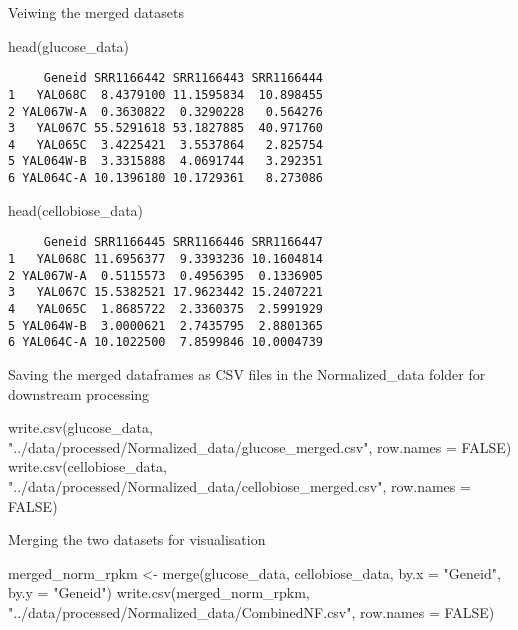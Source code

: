 \documentclass[
  letterpaper,
  DIV=11,
  numbers=noendperiod]{scrartcl}
\newenvironment{Shaded}{\begin{snugshade}}{\end{snugshade}}
\newcommand{\AttributeTok}[1]{\textcolor[rgb]{0.40,0.45,0.13}{#1}}
\newcommand{\ConstantTok}[1]{\textcolor[rgb]{0.56,0.35,0.01}{#1}}
\newcommand{\FunctionTok}[1]{\textcolor[rgb]{0.28,0.35,0.67}{#1}}
\newcommand{\NormalTok}[1]{\textcolor[rgb]{0.00,0.23,0.31}{#1}}
\newcommand{\OtherTok}[1]{\textcolor[rgb]{0.00,0.23,0.31}{#1}}
\newcommand{\StringTok}[1]{\textcolor[rgb]{0.13,0.47,0.30}{#1}}
\begin{document}
Veiwing the merged datasets

\begin{Shaded}
\begin{Highlighting}[]
\FunctionTok{head}\NormalTok{(glucose\_data)}
\end{Highlighting}
\end{Shaded}

\begin{verbatim}
     Geneid SRR1166442 SRR1166443 SRR1166444
1   YAL068C  8.4379100 11.1595834  10.898455
2 YAL067W-A  0.3630822  0.3290228   0.564276
3   YAL067C 55.5291618 53.1827885  40.971760
4   YAL065C  3.4225421  3.5537864   2.825754
5 YAL064W-B  3.3315888  4.0691744   3.292351
6 YAL064C-A 10.1396180 10.1729361   8.273086
\end{verbatim}

\begin{Shaded}
\begin{Highlighting}[]
\FunctionTok{head}\NormalTok{(cellobiose\_data)}
\end{Highlighting}
\end{Shaded}

\begin{verbatim}
     Geneid SRR1166445 SRR1166446 SRR1166447
1   YAL068C 11.6956377  9.3393236 10.1604814
2 YAL067W-A  0.5115573  0.4956395  0.1336905
3   YAL067C 15.5382521 17.9623442 15.2407221
4   YAL065C  1.8685722  2.3360375  2.5991929
5 YAL064W-B  3.0000621  2.7435795  2.8801365
6 YAL064C-A 10.1022500  7.8599846 10.0004739
\end{verbatim}

Saving the merged dataframes as CSV files in the Normalized\_data folder
for downstream processing

\begin{Shaded}
\begin{Highlighting}[]
\FunctionTok{write.csv}\NormalTok{(glucose\_data, }\StringTok{"../data/processed/Normalized\_data/glucose\_merged.csv"}\NormalTok{, }\AttributeTok{row.names =} \ConstantTok{FALSE}\NormalTok{)}
\FunctionTok{write.csv}\NormalTok{(cellobiose\_data, }\StringTok{"../data/processed/Normalized\_data/cellobiose\_merged.csv"}\NormalTok{, }\AttributeTok{row.names =} \ConstantTok{FALSE}\NormalTok{)}
\end{Highlighting}
\end{Shaded}

Merging the two datasets for visualisation

\begin{Shaded}
\begin{Highlighting}[]
\NormalTok{merged\_norm\_rpkm }\OtherTok{\textless{}{-}} \FunctionTok{merge}\NormalTok{(glucose\_data, cellobiose\_data, }
                          \AttributeTok{by.x =} \StringTok{"Geneid"}\NormalTok{, }\AttributeTok{by.y =} \StringTok{"Geneid"}\NormalTok{)}
\FunctionTok{write.csv}\NormalTok{(merged\_norm\_rpkm, }\StringTok{"../data/processed/Normalized\_data/CombinedNF.csv"}\NormalTok{, }\AttributeTok{row.names =} \ConstantTok{FALSE}\NormalTok{)}
\end{Highlighting}
\end{Shaded}
\end{document}
